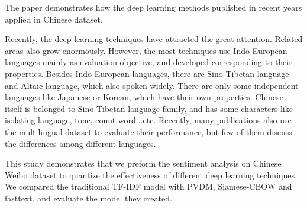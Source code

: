 \begin{abstractEN}

The paper demonstrates how the deep learning methods published in recent years applied in Chinese dataset.

Recently, the deep learning techniques have attracted the great attention. Related areas also grow enormously. 
However, the most techniques use Indo-European languages mainly as evaluation objective, and developed corresponding to their properties.  
Besides Indo-European languages, there are Sino-Tibetan language and Altaic language, which also spoken widely. 
There are only some independent languages like Japanese or Korean, which have their own properties.
Chinese itself is belonged to Sino-Tibetan language family, and has some characters like isolating language, tone, count word...etc.
Recently, many publications also use the multilingual dataset to evaluate their performance, but few of them discuss the differences among different languages. 

This study demonstrates that we preform the sentiment analysis on Chinese Weibo dataset to quantize the effectiveness of different deep learning techniques.
We compared the traditional TF-IDF model with PVDM, Siamese-CBOW and fasttext, and evaluate the model they created.

\end{abstractEN}

